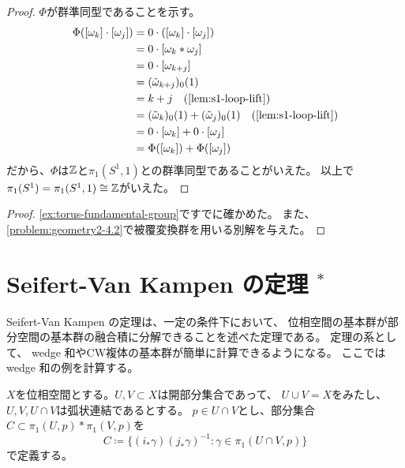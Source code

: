 \documentclass[report]{jlreq}
\begin{document}
\begin{proof}
    $\Phi$が群準同型であることを示す。
    \begin{alignat}{1}
        \Phi([\omega_k] \cdot [\omega_j])
            &= 0 \cdot ([\omega_k] \cdot [\omega_j]) \\
            &= 0 \cdot [\omega_k * \omega_j] \\
            &= 0 \cdot [\omega_{k+j}] \\
            &= (\tilde{\omega}_{k+j})_0(1) \\
            &= k+j \quad (\cref{lem:s1-loop-lift}) \\
            &= (\tilde{\omega}_{k})_0(1) + (\tilde{\omega}_{j})_0(1) \quad (\cref{lem:s1-loop-lift}) \\
            &= 0 \cdot [\omega_{k}] + 0 \cdot [\omega_{j}] \\
            &= \Phi([\omega_k]) + \Phi([\omega_j])
    \end{alignat}
    だから、$\Phi$は$\mathbb{Z}$と$\pi_1(S^1, 1)$との群準同型であることがいえた。
    以上で$\pi_1(S^1) = \pi_1(S^1, 1) \cong \mathbb{Z}$がいえた。
\end{proof}


\begin{proof}
    \cref{ex:torus-fundamental-group}ですでに確かめた。
    また、\cref{problem:geometry2-4.2}で被覆変換群を用いる別解を与えた。
\end{proof}




%
\section{Seifert-Van Kampen の定理 \!${}^*$}

Seifert-Van Kampen の定理は、一定の条件下において、
位相空間の基本群が部分空間の基本群の融合積に分解できることを述べた定理である。
定理の系として、
wedge 和やCW複体の基本群が簡単に計算できるようになる。
ここでは wedge 和の例を計算する。


\begin{theorem}
    $X$を位相空間とする。$U, V \subset X$は開部分集合であって、
    $U \cup V = X$をみたし、$U, V, U \cap V$は弧状連結であるとする。
    $p \in U \cap V$とし、部分集合$C \subset \pi_1(U, p) * \pi_1(V, p)$を
    \begin{equation}
        C \coloneqq \{ (i_* \gamma)(j_* \gamma)^{-1} \colon \gamma \in \pi_1(U \cap V, p) \}
    \end{equation}
    で定義する。
    \TODO{}
\end{theorem}
\end{document}

